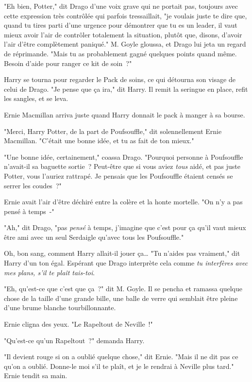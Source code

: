 "Eh bien, Potter," dit Drago d'une voix grave qui ne portait pas, toujours avec cette expression très contrôlée qui parfois tressaillait, "je voulais juste te dire que, quand tu tires parti d'une urgence pour démontrer que tu es un leader, il vaut mieux avoir l'air de contrôler totalement la situation, plutôt que, disons, d'avoir l'air d'être complètement paniqué." M. Goyle gloussa, et Drago lui jeta un regard de réprimande. "Mais tu as probablement gagné quelques points quand même. Besoin d'aide pour ranger ce kit de soin~?"

Harry se tourna pour regarder le Pack de soins, ce qui détourna son visage de celui de Drago. "Je pense que ça ira," dit Harry. Il remit la seringue en place, refit les sangles, et se leva.

Ernie Macmillan arriva juste quand Harry donnait le pack à manger à sa bourse.

"Merci, Harry Potter, de la part de Poufsouffle," dit solennellement Ernie Macmillan. "C'était une bonne idée, et tu as fait de ton mieux."

"Une bonne idée, certainement," coassa Drago. "Pourquoi personne à Poufsouffle n'avait-il sa baguette sortie~? Peut-être que si vous aviez \emph{tous} aidé, et pas juste Potter, vous l'auriez rattrapé. Je pensais que les Poufsouffle étaient censés se serrer les coudes~?"

Ernie avait l'air d'être déchiré entre la colère et la honte mortelle. "On n'y a pas pensé à temps~-"

"Ah," dit Drago, "pas \emph{pensé} à temps, j'imagine que c'est pour ça qu'il vaut mieux être ami avec un seul Serdaigle qu'avec tous les Poufsouffle."

Oh, bon sang, comment Harry allait-il jouer ça… "Tu n'aides pas vraiment," dit Harry d'un ton égal. Espérant que Drago interprète cela comme \emph{tu interfères avec mes plans, s'il te plaît tais-toi}.

"Eh, qu'est-ce que c'est que ça~?" dit M. Goyle. Il se pencha et ramassa quelque chose de la taille d'une grande bille, une balle de verre qui semblait être pleine d'une brume blanche tourbillonnante.

Ernie cligna des yeux. "Le Rapeltout de Neville~!"

"Qu'est-ce qu'un Rapeltout~?" demanda Harry.

"Il devient rouge si on a oublié quelque chose," dit Ernie. "Mais il ne dit pas ce qu'on a oublié. Donne-le moi s'il te plaît, et je le rendrai à Neville plus tard." Ernie tendit sa main.

